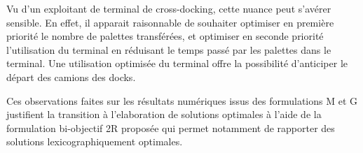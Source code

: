 \documentclass[preprint,12pt,authoryear]{elsarticle}
\begin{document}
Vu d'un exploitant de terminal de cross-docking, cette nuance peut s'avérer sensible. 
En effet, il apparait raisonnable de souhaiter optimiser en première priorité le nombre de palettes transférées, et optimiser en seconde priorité l'utilisation du terminal en réduisant le temps passé par les palettes dans le terminal.
Une utilisation optimisée du terminal offre la possibilité d'anticiper le départ des camions des docks. 

Ces observations faites sur les résultats numériques issus des formulations M et G justifient la transition à l'elaboration de solutions optimales à l'aide de la formulation bi-objectif 2R proposée qui permet notamment de rapporter des solutions lexicographiquement optimales.



 \color{black}
 
\end{document}

